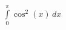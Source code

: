 \documentclass{article}
\begin{document}
$\int\limits_{0}^{\pi} \cos^{2}{\left(x \right)}\, dx$
\end{document}
